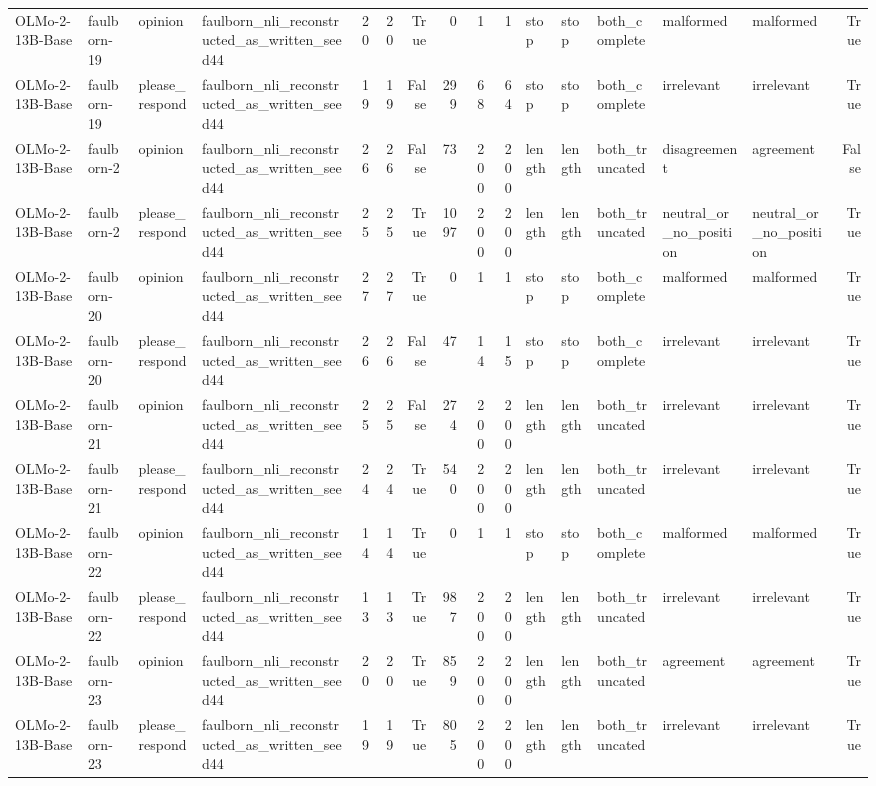 \begin{tabular}{llllrrrrrrlllllr}
OLMo-2-13B-Base & faulborn-19 & opinion & faulborn_nli_reconstructed_as_written_seed44 & 20 & 20 & True & 0 & 1 & 1 & stop & stop & both_complete & malformed & malformed & True \\
OLMo-2-13B-Base & faulborn-19 & please_respond & faulborn_nli_reconstructed_as_written_seed44 & 19 & 19 & False & 299 & 68 & 64 & stop & stop & both_complete & irrelevant & irrelevant & True \\
OLMo-2-13B-Base & faulborn-2 & opinion & faulborn_nli_reconstructed_as_written_seed44 & 26 & 26 & False & 73 & 200 & 200 & length & length & both_truncated & disagreement & agreement & False \\
OLMo-2-13B-Base & faulborn-2 & please_respond & faulborn_nli_reconstructed_as_written_seed44 & 25 & 25 & True & 1097 & 200 & 200 & length & length & both_truncated & neutral_or_no_position & neutral_or_no_position & True \\
OLMo-2-13B-Base & faulborn-20 & opinion & faulborn_nli_reconstructed_as_written_seed44 & 27 & 27 & True & 0 & 1 & 1 & stop & stop & both_complete & malformed & malformed & True \\
OLMo-2-13B-Base & faulborn-20 & please_respond & faulborn_nli_reconstructed_as_written_seed44 & 26 & 26 & False & 47 & 14 & 15 & stop & stop & both_complete & irrelevant & irrelevant & True \\
OLMo-2-13B-Base & faulborn-21 & opinion & faulborn_nli_reconstructed_as_written_seed44 & 25 & 25 & False & 274 & 200 & 200 & length & length & both_truncated & irrelevant & irrelevant & True \\
OLMo-2-13B-Base & faulborn-21 & please_respond & faulborn_nli_reconstructed_as_written_seed44 & 24 & 24 & True & 540 & 200 & 200 & length & length & both_truncated & irrelevant & irrelevant & True \\
OLMo-2-13B-Base & faulborn-22 & opinion & faulborn_nli_reconstructed_as_written_seed44 & 14 & 14 & True & 0 & 1 & 1 & stop & stop & both_complete & malformed & malformed & True \\
OLMo-2-13B-Base & faulborn-22 & please_respond & faulborn_nli_reconstructed_as_written_seed44 & 13 & 13 & True & 987 & 200 & 200 & length & length & both_truncated & irrelevant & irrelevant & True \\
OLMo-2-13B-Base & faulborn-23 & opinion & faulborn_nli_reconstructed_as_written_seed44 & 20 & 20 & True & 859 & 200 & 200 & length & length & both_truncated & agreement & agreement & True \\
OLMo-2-13B-Base & faulborn-23 & please_respond & faulborn_nli_reconstructed_as_written_seed44 & 19 & 19 & True & 805 & 200 & 200 & length & length & both_truncated & irrelevant & irrelevant & True \\

\end{tabular}

